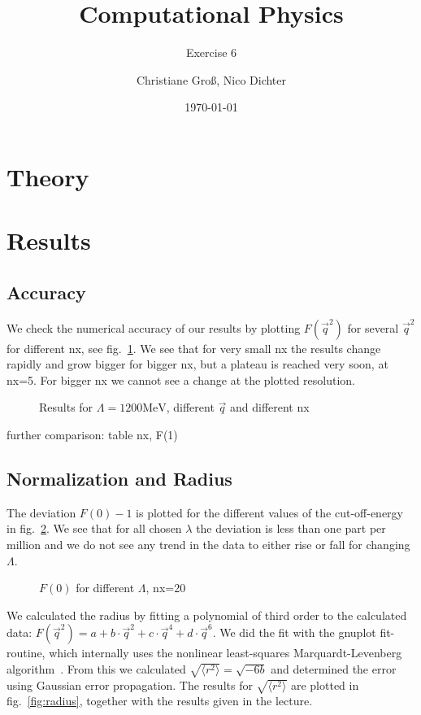 \documentclass{scrartcl}
\title{Computational Physics}
\subtitle{Exercise 6}
\date{\today}
\author{Christiane Groß, Nico Dichter}
\begin{document}
	\maketitle
	
\section{Theory}

\section{Results}
\subsection{Accuracy}

We check the numerical accuracy of our results by plotting $F(\vec{q}^2)$ for several $\vec{q}^2$ for different nx, see fig.~\ref{fig:accuracy}. We see that for very small nx the results change rapidly and grow bigger for bigger nx, but a plateau is reached very soon, at nx=5. For bigger nx we cannot see a change at the plotted resolution. 

\begin{figure}[htbp]
	
	\caption{Results for $\Lambda=1200\si{\mega\electronvolt}$, different $\vec{q}$ and different nx}
	\label{fig:accuracy}
\end{figure}

further comparison: table nx, F(1)

\subsection{Normalization and Radius}
The deviation $F(0)-1$ is plotted for the different values of the cut-off-energy in fig.~\ref{fig:fofzero}. We see that for all chosen $\lambda$ the deviation is less than one part per million and we do not see any trend in the data to either rise or fall for changing $\Lambda$.
  
  
\begin{figure}[htbp]
	
	\caption{$F(0)$ for different $\Lambda$, nx=20}
	\label{fig:fofzero}
\end{figure}

We calculated the radius by fitting a polynomial of third order to the calculated data: $F(\vec{q}^2)=a+b\cdot \vec{q}^2+c\cdot\vec{q}^4+d\cdot\vec{q}^6$. We did the fit with the gnuplot fit-routine, which internally uses the nonlinear least-squares Marquardt-Levenberg algorithm~\cite[p. 74]{gnuplotdoc}. From this we calculated $\sqrt{\langle r^2\rangle}=\sqrt{-6b}$ and determined the error using Gaussian error propagation. The results for $\sqrt{\langle r^2\rangle}$ are plotted in fig.~\ref{fig:radius}, together with the results given in the lecture.
\end{document}
